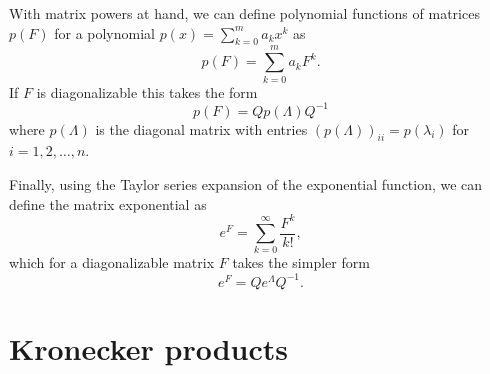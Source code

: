 With matrix powers at hand, we can define polynomial functions of 
matrices $p(F)$ for a polynomial $p(x) = \sum_{k=0}^m a_k x^k$ as
\begin{equation*}
    p(F) = \sum_{k=0}^m a_k F^k.
\end{equation*}
 If $F$ is diagonalizable this takes the form
\begin{equation*}
p(F) = Q p(\Lambda) Q^{-1}
\end{equation*}
where $p(\Lambda)$ is the diagonal matrix with entries $(p(\Lambda))_{ii} = p(\lambda_i)$ for $i=1,2,\ldots,n$. 

Finally, using the Taylor series expansion of the exponential function, we can define the matrix exponential as
\begin{equation*}
    e^F = \sum_{k=0}^\infty \frac{F^k}{k!},
\end{equation*}
which for a diagonalizable matrix $F$ takes the simpler form 
\begin{equation*}
    e^F = Q e^{\Lambda} Q^{-1}.
\end{equation*}

\section{Kronecker products}

